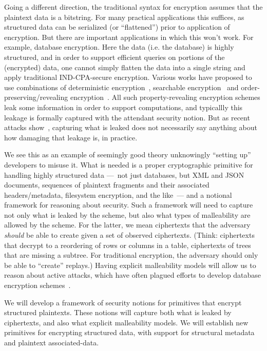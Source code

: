 Going a different direction, the traditional syntax for encryption assumes that
the plaintext data is a bitstring.  For many practical applications this
suffices, as structured data can be serialized (or ``flattened'') prior to
application of encryption.  But there are important applications in which this
won't work.  For example, database encryption.  Here the data (i.e. the
database) is highly structured, and in order to support efficient queries on
portions of the (encrypted) data, one cannot simply flatten the data into a
single string and apply traditional IND-CPA-secure encryption.  Various works
have proposed to use combinations of deterministic
encryption~\cite{BBO07}, searchable
encryption~\cite{CJJ+13} and order-preserving/revealing
encryption~\cite{KW16}. All such property-revealing encryption schemes leak some
information in order to support computations, and typicallly this leakage is
formally captured with the attendant security notion.  But as recent attacks
show~\cite{Cash15,GSB+17,NKW15}, capturing what is
leaked does not necessarily say anything about how damaging that leakage is, in
practice.

We see this as an example of seemingly good theory unknowingly
``setting up'' developers to misuse it.  What is needed is a proper
cryptographic primitive for handling highly structured data ---~not
just databases, but XML and JSON documents, sequences of plaintext
fragments and their associated headers/metadata, filesystem
encryption, and the like~--- and a notional framework for reasoning
about security.  Such a framework will need to capture not only what
is leaked by the scheme, but also what types of malleability are
allowed by the scheme.  For the latter, we mean ciphertexts that the
adversary \emph{should} be able to create given a set of observed
ciphertexts.  (Think: ciphertexts that decrypt to a reordering of rows
or columns in a table, ciphertexts of trees that are missing a
subtree.  For traditional encryption, the adversary should only be
able to ``create'' replays.)  Having explicit malleability models will allow us to
reason about active attacks, which have often plagued efforts to
develop database encryption schemes~\cite{GRS17}.

\begin{task}
We will develop a framework of security notions for primitives that
encrypt structured plaintexts.  These notions will capture both what
is leaked by ciphertexts, and also what explicit malleability models.
We will establish new primitives for encrypting structured data, with
support for structural metadata and plaintext associated-data.
\end{task}



